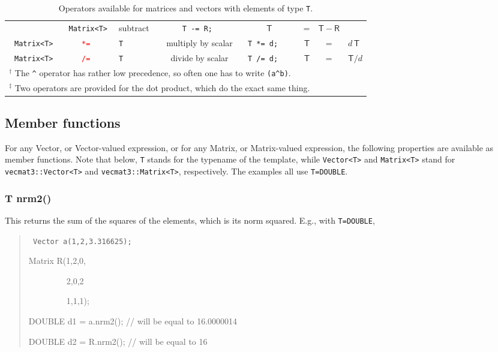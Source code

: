 \documentclass[12pt,twoside]{article}
\newcommand{\Vector}{{Vector}}
\newcommand{\Matrix}{{Matrix}}
\newcommand{\TT}{{\tt<}T{\tt>}}
\begin{document}
\begin{table}[t]
\begin{center}
\begin{tabular}{|rcl|c|c|rcl|}
&\texttt{ Matrix<T>} 
& subtract 
& \tt T -= R; 
& $\quad \mathsf T$&=&$\mathsf T -\mathsf R$\\
%
\texttt{Matrix<T>}&
\texttt{\textcolor{red}{*=}}
&\texttt{T} 
& multiply by scalar
& \tt T *= d; 
& $\quad \mathsf T$&=&$d\,\mathsf T$\\
%
 \texttt{Matrix<T>}
&\texttt{\textcolor{red}{/=}}
&\texttt{T} 
& divide by scalar
& \tt T /= d; 
& $\quad \mathsf T$&=&$\mathsf T/d$\\
\hline
\multicolumn{6}{l}{
$^\dagger$ The \texttt \^{} operator has rather low precedence, so
often one has to write \texttt{(a\^{}b)}.
}\\\multicolumn{6}{l}{
$^\ddagger$ Two operators are provided for the dot product, which do
the exact same thing. 
}
\end{tabular}
\end{center}
\caption{Operators available for matrices and
  vectors with elements of type \texttt{T}. }
\end{table}



\subsection{Member functions}

For any \Vector, or \Vector-valued expression, or for any \Matrix, or
\Matrix-valued expression, the following properties are available as
member functions. Note that below, {\tt T} stands for the typename of the template, while {\tt Vector\TT{}} and {\tt Matrix\TT{}} stand for {\tt vecmat3::Vector\TT{}} and {\tt vecmat3::Matrix\TT{}}, respectively.  The examples all use {\tt T=DOUBLE}.

\subsubsection{T nrm2()}

This returns the sum of the squares of the elements, which is its norm
squared. E.g., with {\tt T=DOUBLE},
\begin{quote} \tt
  Vector a(1,2,3.316625);

  Matrix R(1,2,0,

\ \ \ \ \ \ \ \ \ 2,0,2
	   
\ \ \ \ \ \ \ \	\ 1,1,1);

  DOUBLE d1 = a.nrm2(); // will be equal to 16.0000014

  DOUBLE d2 = R.nrm2(); // will be equal to 16
\end{quote}
\end{document}

